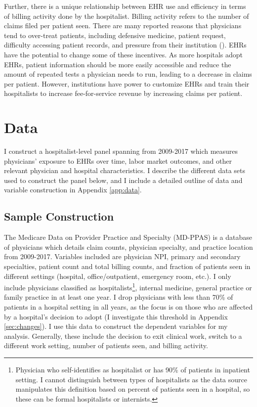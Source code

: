 \documentclass[12pt]{article}
\begin{document}
Further, there is a unique relationship between EHR use and efficiency in terms of billing activity done by the hospitalist. Billing activity refers to the number of claims filed per patient seen. There are many reported reasons that physicians tend to over-treat patients, including defensive medicine, patient request, difficulty accessing patient records, and pressure from their institution (\cite{lyu2017overtreatment}). EHRs have the potential to change some of these incentives. As more hospitals adopt EHRs, patient information should be more easily accessible and reduce the amount of repeated tests a physician needs to run, leading to a decrease in claims per patient. However, institutions have power to customize EHRs and train their hospitalists to increase fee-for-service revenue by increasing claims per patient. 





\section{Data}\label{sec:data}

I construct a hospitalist-level panel spanning from 2009-2017 which measures physicians' exposure to EHRs over time, labor market outcomes, and other relevant physician and hospital characteristics. I describe the different data sets used to construct the panel below, and I include a detailed outline of data and variable construction in Appendix \ref{app:data}.

\subsection{Sample Construction}

The Medicare Data on Provider Practice and Specialty (MD-PPAS) is a database of physicians which details claim counts, physician specialty, and practice location from 2009-2017. Variables included are physician NPI, primary and secondary specialties, patient count and total billing counts, and fraction of patients seen in different settings (hospital, office/outpatient, emergency room, etc.). I only include physicians classified as hospitalists\footnote{Physician who self-identifies as hospitalist or has 90\% of patients in inpatient setting. I cannot distinguish between types of hospitalists as the data source manipulates this definition based on percent of patients seen in a hospital, so these can be formal hospitalists or internists.}, internal medicine, general practice or family practice in at least one year. I drop physicians with less than 70\% of patients in a hospital setting in all years, as the focus is on those who are affected by a hospital's decision to adopt (I investigate this threshold in Appendix \ref{sec:changes}). I use this data to construct the dependent variables for my analysis. Generally, these include the decision to exit clinical work, switch to a different work setting, number of patients seen, and billing activity. 
\end{document}
